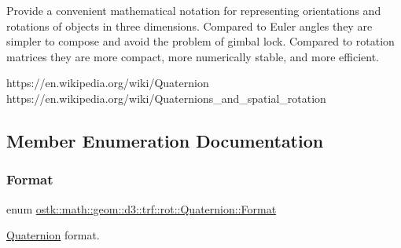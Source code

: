 Provide a convenient mathematical notation for representing orientations and rotations of objects in three dimensions. Compared to Euler angles they are simpler to compose and avoid the problem of gimbal lock. Compared to rotation matrices they are more compact, more numerically stable, and more efficient.

https\+://en.wikipedia.\+org/wiki/\+Quaternion https\+://en.wikipedia.\+org/wiki/\+Quaternions\+\_\+and\+\_\+spatial\+\_\+rotation 

\subsection{Member Enumeration Documentation}
\mbox{\label{classostk_1_1math_1_1geom_1_1d3_1_1trf_1_1rot_1_1_quaternion_aa7a75f0dd505a58236ee355959e00bfd}} 
\subsubsection{\texorpdfstring{Format}{Format}}
{\footnotesize\ttfamily enum \hyperlink{classostk_1_1math_1_1geom_1_1d3_1_1trf_1_1rot_1_1_quaternion_aa7a75f0dd505a58236ee355959e00bfd}{ostk\+::math\+::geom\+::d3\+::trf\+::rot\+::\+Quaternion\+::\+Format}\hspace{0.3cm}{\ttfamily [strong]}}



\hyperlink{classostk_1_1math_1_1geom_1_1d3_1_1trf_1_1rot_1_1_quaternion}{Quaternion} format. 

